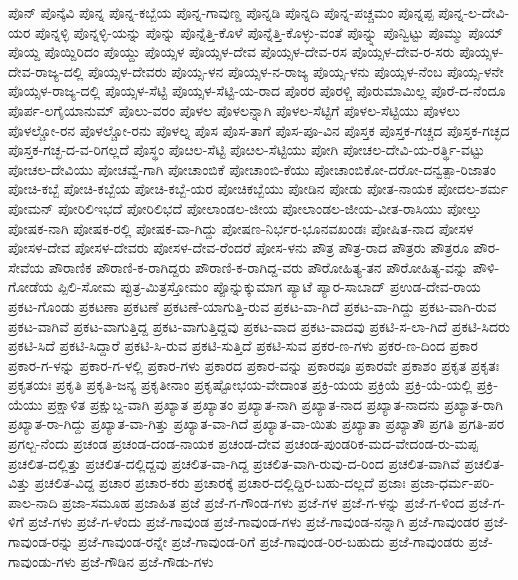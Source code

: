 ಪೊನ್
ಪೊನ್ಕೆವಿ
ಪೊನ್ನ
ಪೊನ್ನ-ಕಬ್ಬೆಯ
ಪೊನ್ನ-ಗಾವುಣ್ಡ
ಪೊನ್ನಡಿ
ಪೊನ್ನದಿ
ಪೊನ್ನ-ಪಚ್ಚಮಂ
ಪೊನ್ನಪ್ಪ
ಪೊನ್ನ-ಲ-ದೇವಿ-ಯರ
ಪೊನ್ನಳ್ಳಿ
ಪೊನ್ನಳ್ಳಿ-ಯನ್ನು
ಪೊನ್ನು
ಪೊನ್ನೆತ್ತಿ-ಕೊಳೆ
ಪೊನ್ನೆತ್ತಿ-ಕೊಳ್ಳು-ವಂತೆ
ಪೊನ್ನ್ನು
ಪೊನ್ವಿಟ್ಟು
ಪೊಮ್ಮು
ಪೊಯ್
ಪೊಯ್ದ
ಪೊಯ್ದಿರಿದಂ
ಪೊಯ್ದು
ಪೊಯ್ಸಳ
ಪೊಯ್ಸಳ-ದೇವ
ಪೊಯ್ಸಳ-ದೇವ-ರಸ
ಪೊಯ್ಸಳ-ದೇವ-ರ-ಸರು
ಪೊಯ್ಸಳ-ದೇವ-ರಾಜ್ಯ-ದಲ್ಲಿ
ಪೊಯ್ಸಳ-ದೇವರು
ಪೊಯ್ಸ-ಳನ
ಪೊಯ್ಸಳ-ನ-ರಾಜ್ಯ
ಪೊಯ್ಸ-ಳನು
ಪೊಯ್ಸಳ-ನೆಂಬ
ಪೊಯ್ಸ-ಳನೇ
ಪೊಯ್ಸಳ-ರಾಜ್ಯ-ದಲ್ಲಿ
ಪೊಯ್ಸಳ-ಸೆಟ್ಟಿ
ಪೊಯ್ಸಳ-ಸೆಟ್ಟಿ-ಯ-ರಾದ
ಪೊರರ
ಪೊರಳ್ಚಿ
ಪೊರುಮಾಮಿಲ್ಲ
ಪೊರೆ-ದ-ನೆಂದೂ
ಪೊರ್ಪ-ಲಗೈಯಾನುಮ್
ಪೊಲು-ವರಂ
ಪೊಳಲ
ಪೊಳಲನ್ನಾಗಿ
ಪೊಳಲ-ಸೆಟ್ಟಿಗೆ
ಪೊಳಲ-ಸೆಟ್ಟಿಯು
ಪೊಳಲು
ಪೊಳಲ್ಚೋ-ರನ
ಪೊಳಲ್ಚೋ-ರನು
ಪೊಳಲ್ನ
ಪೊಸ
ಪೊಸ-ತಾಗೆ
ಪೊಸ-ಪೂ-ವಿನ
ಪೊಸ್ತಕ
ಪೊಸ್ತಕ-ಗಚ್ಚದ
ಪೊಸ್ತಕ-ಗಚ್ಛದ
ಪೊಸ್ತಕ-ಗಚ್ಛ-ದ-ವ-ರಿಗಲ್ಲದೆ
ಪೊಸ್ಥಂ
ಪೊೞಲ-ಸೆಟ್ಟಿ
ಪೊೞಲ-ಸೆಟ್ಟಿಯು
ಪೋಗಿ
ಪೋಚಲ-ದೇವಿ-ಯ-ರರ್ತ್ಥಿ-ವಟ್ಟು
ಪೋಚಲ-ದೇವಿಯು
ಪೋಚವ್ವೆ-ಗಾಗಿ
ಪೋಚಾಂಬಿಕೆ
ಪೋಚಾಂಬಿ-ಕೆಯು
ಪೋಚಾಂಬಿಕೋ-ದರೋ-ದನ್ವತ್ಪಾ-ರಿಜಾತಂ
ಪೋಚಿ-ಕಬ್ಬೆ
ಪೋಚಿ-ಕಬ್ಬೆಯ
ಪೋಚಿ-ಕಬ್ಬೆ-ಯರ
ಪೋಚಿಕಬ್ಬೆಯು
ಪೋಡಿನ
ಪೋಡು
ಪೋತ-ನಾಯಕ
ಪೋದಲ-ಶರ್ಮ
ಪೋಮನ್
ಪೋರಿಲಿಇಭದೆ
ಪೋರಿಲಿಭದೆ
ಪೋಲಾಂಡಲ-ಜೀಯ
ಪೋಲಾಂಡಲ-ಜೀಯ-ವೀತ-ರಾಸಿಯು
ಪೋಲ್ತು
ಪೋಷಕ-ನಾಗಿ
ಪೋಷಕ-ರಲ್ಲಿ
ಪೋಷಕ-ವಾ-ಗಿದ್ದು
ಪೋಷಣ-ನಿರ್ಭರ-ಭೂನವಖಂಡಃ
ಪೋಷಿತ-ನಾದ
ಪೋಸಳ
ಪೋಸಳ-ದೇವ
ಪೋಸಳ-ದೇವರು
ಪೋಸಳ-ದೇವ-ರೆಂದರೆ
ಪೋಸ-ಳನು
ಪೌತ್ರ
ಪೌತ್ರ-ರಾದ
ಪೌತ್ರರು
ಪೌತ್ರರೂ
ಪೌರ-ಸೇವೆಯ
ಪೌರಾಣಿಕ
ಪೌರಾಣಿ-ಕ-ರಾಗಿದ್ದರು
ಪೌರಾಣಿ-ಕ-ರಾಗಿದ್ದ-ವರು
ಪೌರೋಹಿತ್ಯ-ತನ
ಪೌರೋಹಿತ್ಯ-ವನ್ನು
ಪೌಳಿ-ಗೋಡೆಯ
ಪ್ಪಿಲಿ-ಸೋಮ
ಪ್ಪುತ್ರ-ಮಿತ್ರಸ್ತೋಮಂ
ಪ್ಪೊನ್ನುಕ್ಕುಮಾಗ
ಪ್ಯಾಟೆ
ಪ್ಯಾರ-ಸಾಬಾದ್
ಪ್ರಉಡ-ದೇವ-ರಾಯ
ಪ್ರಕಟ-ಗೊಂಡು
ಪ್ರಕಟಣಾ
ಪ್ರಕಟಣೆ
ಪ್ರಕಟಣೆ-ಯಾಗುತ್ತಿ-ರುವ
ಪ್ರಕಟ-ವಾ-ಗಿದೆ
ಪ್ರಕಟ-ವಾ-ಗಿದ್ದು
ಪ್ರಕಟ-ವಾಗಿ-ರುವ
ಪ್ರಕಟ-ವಾಗಿವೆ
ಪ್ರಕಟ-ವಾಗುತ್ತಿದ್ದ
ಪ್ರಕಟ-ವಾಗುತ್ತಿದ್ದವು
ಪ್ರಕಟ-ವಾದ
ಪ್ರಕಟ-ವಾದವು
ಪ್ರಕಟಿ-ಸ-ಲಾ-ಗಿದೆ
ಪ್ರಕಟಿ-ಸಿದರು
ಪ್ರಕಟಿ-ಸಿದೆ
ಪ್ರಕಟಿ-ಸಿದ್ದಾರೆ
ಪ್ರಕಟಿ-ಸಿ-ರುವ
ಪ್ರಕಟಿ-ಸುತ್ತಿದೆ
ಪ್ರಕಟಿ-ಸುವ
ಪ್ರಕರ-ಣ-ಗಳು
ಪ್ರಕರ-ಣ-ದಿಂದ
ಪ್ರಕಾರ
ಪ್ರಕಾರ-ಗ-ಳನ್ನು
ಪ್ರಕಾರ-ಗ-ಳಲ್ಲಿ
ಪ್ರಕಾರ-ಗಳು
ಪ್ರಕಾರದ
ಪ್ರಕಾರ-ವನ್ನು
ಪ್ರಕಾರವೂ
ಪ್ರಕಾರವೇ
ಪ್ರಕಾಶಂ
ಪ್ರಕೃತ
ಪ್ರಕೃತಃ
ಪ್ರಕೃತಯಃ
ಪ್ರಕೃತಿ
ಪ್ರಕೃತಿ-ಜನ್ಯ
ಪ್ರಕೃತೀನಾಂ
ಪ್ರಕೃಷ್ಟೋಭಯ-ವೇದಾಂತ
ಪ್ರಕ್ರಿ-ಯಯ
ಪ್ರಕ್ರಿಯೆ
ಪ್ರಕ್ರಿ-ಯೆ-ಯಲ್ಲಿ
ಪ್ರಕ್ರಿ-ಯೆಯು
ಪ್ರಕ್ಷಾಳಿತ
ಪ್ರಕ್ಷುಬ್ದ-ವಾಗಿ
ಪ್ರಖ್ಯಾತ
ಪ್ರಖ್ಯಾತಂ
ಪ್ರಖ್ಯಾತ-ನಾಗಿ
ಪ್ರಖ್ಯಾತ-ನಾದ
ಪ್ರಖ್ಯಾತ-ನಾದನು
ಪ್ರಖ್ಯಾತ-ರಾಗಿ
ಪ್ರಖ್ಯಾತ-ರಾ-ಗಿದ್ದು
ಪ್ರಖ್ಯಾತ-ವಾ-ಗಿತ್ತು
ಪ್ರಖ್ಯಾತ-ವಾ-ಗಿದೆ
ಪ್ರಖ್ಯಾತ-ವಾ-ಯಿತು
ಪ್ರಖ್ಯಾತಾ
ಪ್ರಖ್ಯಾತೌ
ಪ್ರಗತಿ
ಪ್ರಗತಿ-ಪರ
ಪ್ರಗಲ್ಬ-ನೆಂದು
ಪ್ರಚಂಡ
ಪ್ರಚಂಡ-ದಂಡ-ನಾಯಕ
ಪ್ರಚಂಡ-ದೇವ
ಪ್ರಚಂಡ-ಪುಂಡರಿಕ-ಮದ-ವೇದಂಡ-ರು-ಮಪ್ಪ
ಪ್ರಚಲಿತ-ದಲ್ಲಿತ್ತು
ಪ್ರಚಲಿತ-ದಲ್ಲಿದ್ದವು
ಪ್ರಚಲಿತ-ವಾ-ಗಿದ್ದ
ಪ್ರಚಲಿತ-ವಾಗಿ-ರುವು-ದ-ರಿಂದ
ಪ್ರಚಲಿತ-ವಾಗಿವೆ
ಪ್ರಚಲಿತ-ವಿತ್ತು
ಪ್ರಚಲಿತ-ವಿದ್ದ
ಪ್ರಚಾರ
ಪ್ರಚಾರ-ಕರು
ಪ್ರಚಾರಕ್ಕೆ
ಪ್ರಚಾರ-ದಲ್ಲಿದ್ದಿರ-ಬಹು-ದಲ್ಲದೆ
ಪ್ರಜಾಃ
ಪ್ರಜಾ-ಧರ್ಮ-ಪರಿ-ಪಾಲ-ನಾದಿ
ಪ್ರಜಾ-ಸಮೂಹ
ಪ್ರಜಾಹಿತ
ಪ್ರಜೆ
ಪ್ರಜೆ-ಗ-ಗೌಂಡ-ಗಳು
ಪ್ರಜೆ-ಗಳ
ಪ್ರಜೆ-ಗ-ಳನ್ನು
ಪ್ರಜೆ-ಗ-ಳಿಂದ
ಪ್ರಜೆ-ಗ-ಳಿಗೆ
ಪ್ರಜೆ-ಗಳು
ಪ್ರಜೆ-ಗ-ಳೆಂದು
ಪ್ರಜೆ-ಗಾವುಂಡ
ಪ್ರಜೆ-ಗಾವುಂಡ-ಗಳು
ಪ್ರಜೆ-ಗಾವುಂಡ-ನನ್ನಾಗಿ
ಪ್ರಜೆ-ಗಾವುಂಡರ
ಪ್ರಜೆ-ಗಾವುಂಡ-ರನ್ನು
ಪ್ರಜೆ-ಗಾವುಂಡ-ರನ್ನೇ
ಪ್ರಜೆ-ಗಾವುಂಡ-ರಿಗೆ
ಪ್ರಜೆ-ಗಾವುಂಡ-ರಿರ-ಬಹುದು
ಪ್ರಜೆ-ಗಾವುಂಡರು
ಪ್ರಜೆ-ಗಾವುಂಡು-ಗಳು
ಪ್ರಜೆ-ಗೌಡಿನ
ಪ್ರಜೆ-ಗೌಡು-ಗಳು
